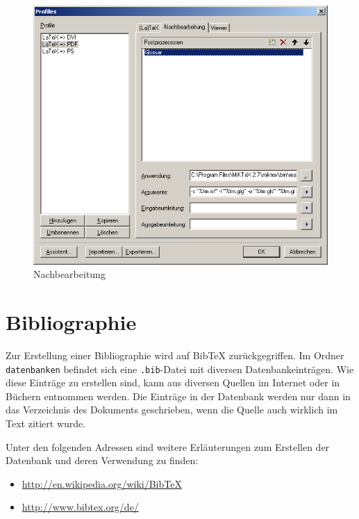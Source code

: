 \begin{figure}[H]
	\centering
		\includegraphics[scale=0.7]{bilder/profiles_glossar.png}
	\caption{Nachbearbeitung}
	\label{fig:nachbearbeitung}
\end{figure}


\section{Bibliographie}
\label{sec:anleitungen_bibliographie}

Zur Erstellung einer Bibliographie wird auf \gls{BibTeX} zurückgegriffen. Im Ordner \texttt{datenbanken} befindet sich eine \texttt{.bib}-Datei mit diversen Datenbankeinträgen. Wie diese Einträge zu erstellen sind, kann aus diversen Quellen im Internet oder in Büchern entnommen werden. Die Einträge in der Datenbank werden nur dann in das Verzeichnis des Dokuments geschrieben, wenn die Quelle auch wirklich im Text zitiert wurde.

Unter den folgenden Adressen sind weitere Erläuterungen zum Erstellen der Datenbank und deren Verwendung zu finden:
\begin{itemize}
	\item \url{http://en.wikipedia.org/wiki/BibTeX}
	\item \url{http://www.bibtex.org/de/}
\end{itemize}


